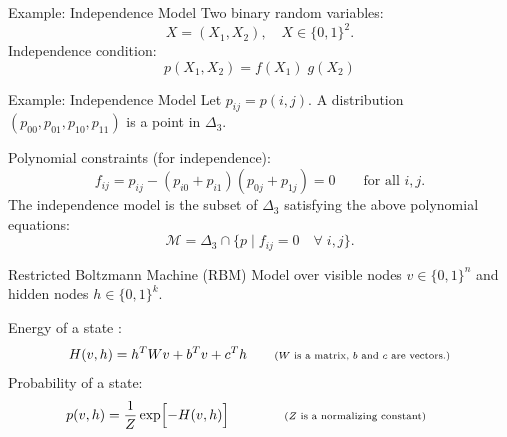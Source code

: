 \documentclass[mathserif,xcolor=dvipsnames]{beamer}
\begin{document}
\begin{frame}
    \linespace
    \linespace
    \begin{center}
    \end{center}
\end{frame}

\begin{frame}{Example: Independence Model}
    Two binary random variables:
    \[
        X = (X_1, X_2), \quad X \in \{0,1\}^2.
    \]
    Independence condition:
    \[
        p(X_1, X_2) = f(X_1)\;g(X_2)
    \]
\end{frame}

\begin{frame}{Example: Independence Model}
    Let $p_{ij} = p(i,j)$. A distribution $(p_{00}, p_{01}, p_{10}, p_{11})$
    is a point in $\Delta_3$.

    \linespace
    Polynomial constraints (for independence):
    \[
        f_{ij} = p_{ij} - (p_{i0} + p_{i1}) (p_{0j} + p_{1j}) = 0
        \qquad
        \text{for all }i,j.
    \]
    The independence model is the subset of $\Delta_3$ satisfying the above
    polynomial equations:
    \[
        \mathcal{M} = \Delta_3 \cap \{p  \mid f_{ij} = 0 \quad\forall\; i,j\}.
    \]
\end{frame}

\begin{frame}{Restricted Boltzmann Machine (RBM)}
    Model over visible nodes $v \in \{0,1\}^n$ and hidden nodes $h \in
    \{0,1\}^k$.
    \begin{center}
    \end{center}
    \vspace{-0.5cm}
    Energy of a state :
    \[
        H(v, h) = h^T W v  + b^T v + c^T h
        \qquad
        \text{\scriptsize ($W$ is a matrix, $b$ and $c$ are vectors.)}
    \]
    Probability of a state:
    \[
        p(v, h) = \frac 1 Z \exp\sdil[\Big]{-H(v, h)}
        \qquad\qquad
        \text{\scriptsize ($Z$ is a normalizing constant)}
        \qquad
    \]
\end{frame}
\end{document}
